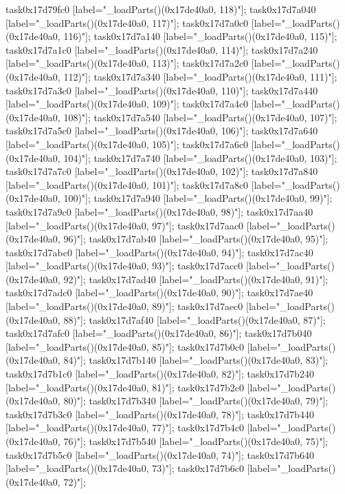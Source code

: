 {	task0x17d79fc0 [label="_loadParts()(0x17de40a0, 118)"];
	task0x17d7a040 [label="_loadParts()(0x17de40a0, 117)"];
	task0x17d7a0c0 [label="_loadParts()(0x17de40a0, 116)"];
	task0x17d7a140 [label="_loadParts()(0x17de40a0, 115)"];
	task0x17d7a1c0 [label="_loadParts()(0x17de40a0, 114)"];
	task0x17d7a240 [label="_loadParts()(0x17de40a0, 113)"];
	task0x17d7a2c0 [label="_loadParts()(0x17de40a0, 112)"];
	task0x17d7a340 [label="_loadParts()(0x17de40a0, 111)"];
	task0x17d7a3c0 [label="_loadParts()(0x17de40a0, 110)"];
	task0x17d7a440 [label="_loadParts()(0x17de40a0, 109)"];
	task0x17d7a4c0 [label="_loadParts()(0x17de40a0, 108)"];
	task0x17d7a540 [label="_loadParts()(0x17de40a0, 107)"];
	task0x17d7a5c0 [label="_loadParts()(0x17de40a0, 106)"];
	task0x17d7a640 [label="_loadParts()(0x17de40a0, 105)"];
	task0x17d7a6c0 [label="_loadParts()(0x17de40a0, 104)"];
	task0x17d7a740 [label="_loadParts()(0x17de40a0, 103)"];
	task0x17d7a7c0 [label="_loadParts()(0x17de40a0, 102)"];
	task0x17d7a840 [label="_loadParts()(0x17de40a0, 101)"];
	task0x17d7a8c0 [label="_loadParts()(0x17de40a0, 100)"];
	task0x17d7a940 [label="_loadParts()(0x17de40a0, 99)"];
	task0x17d7a9c0 [label="_loadParts()(0x17de40a0, 98)"];
	task0x17d7aa40 [label="_loadParts()(0x17de40a0, 97)"];
	task0x17d7aac0 [label="_loadParts()(0x17de40a0, 96)"];
	task0x17d7ab40 [label="_loadParts()(0x17de40a0, 95)"];
	task0x17d7abc0 [label="_loadParts()(0x17de40a0, 94)"];
	task0x17d7ac40 [label="_loadParts()(0x17de40a0, 93)"];
	task0x17d7acc0 [label="_loadParts()(0x17de40a0, 92)"];
	task0x17d7ad40 [label="_loadParts()(0x17de40a0, 91)"];
	task0x17d7adc0 [label="_loadParts()(0x17de40a0, 90)"];
	task0x17d7ae40 [label="_loadParts()(0x17de40a0, 89)"];
	task0x17d7aec0 [label="_loadParts()(0x17de40a0, 88)"];
	task0x17d7af40 [label="_loadParts()(0x17de40a0, 87)"];
	task0x17d7afc0 [label="_loadParts()(0x17de40a0, 86)"];
	task0x17d7b040 [label="_loadParts()(0x17de40a0, 85)"];
	task0x17d7b0c0 [label="_loadParts()(0x17de40a0, 84)"];
	task0x17d7b140 [label="_loadParts()(0x17de40a0, 83)"];
	task0x17d7b1c0 [label="_loadParts()(0x17de40a0, 82)"];
	task0x17d7b240 [label="_loadParts()(0x17de40a0, 81)"];
	task0x17d7b2c0 [label="_loadParts()(0x17de40a0, 80)"];
	task0x17d7b340 [label="_loadParts()(0x17de40a0, 79)"];
	task0x17d7b3c0 [label="_loadParts()(0x17de40a0, 78)"];
	task0x17d7b440 [label="_loadParts()(0x17de40a0, 77)"];
	task0x17d7b4c0 [label="_loadParts()(0x17de40a0, 76)"];
	task0x17d7b540 [label="_loadParts()(0x17de40a0, 75)"];
	task0x17d7b5c0 [label="_loadParts()(0x17de40a0, 74)"];
	task0x17d7b640 [label="_loadParts()(0x17de40a0, 73)"];
	task0x17d7b6c0 [label="_loadParts()(0x17de40a0, 72)"];
}
